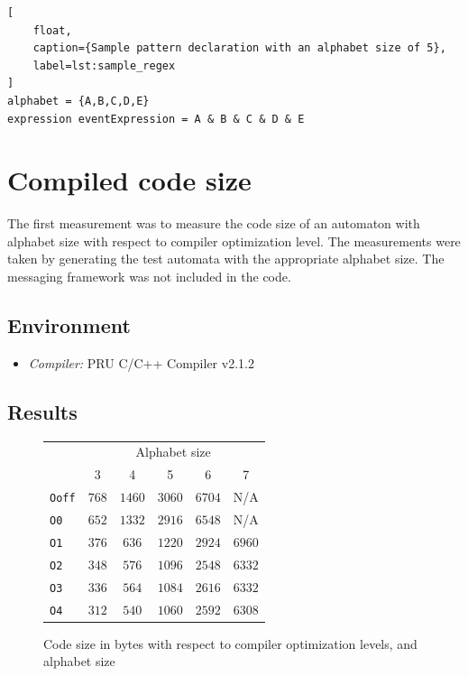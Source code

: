 \begin{lstlisting}[
	float,
	caption={Sample pattern declaration with an alphabet size of 5},
	label=lst:sample_regex
]
alphabet = {A,B,C,D,E}
expression eventExpression = A & B & C & D & E
\end{lstlisting}

\section{Compiled code size}

The first measurement was to measure the code size of an automaton with alphabet size with respect to compiler optimization level. The measurements were taken by generating the test automata with the appropriate alphabet size. The messaging framework was not included in the code.

\subsection{Environment}
\begin{itemize}
	\item \emph{Compiler:} PRU C/C++ Compiler v2.1.2
\end{itemize}

\subsection{Results}

\begin{figure}
	\centering
	\caption{Code size in bytes with respect to compiler optimization levels, and alphabet size}
	\begin{tabular}{l c c c c c}
		\toprule
		& \multicolumn{5}{c}{Alphabet size} \\
		\cmidrule(r){2-6}
		& 3 & 4 & 5 & 6 & 7 \\
		\midrule
		\texttt{Ooff} & $768$ &		$1460$ &	$3060$ & 	$6704$ & 	N/A \\
		\texttt{O0}   & $652$ &		$1332$ &	$2916$ & 	$6548$ & 	N/A \\
		\texttt{O1}   & $376$ &		$636$ &		$1220$ & 	$2924$ & 	$6960$ \\
		\texttt{O2}   & $348$ &		$576$ &		$1096$ & 	$2548$ & 	$6332$ \\
		\texttt{O3}   & $336$ &		$564$ &		$1084$ & 	$2616$ & 	$6332$ \\
		\texttt{O4}   & $312$ &		$540$ &		$1060$ & 	$2592$ & 	$6308$  \\
		\bottomrule
	\end{tabular}
	\label{fig:code_size}
\end{figure}

